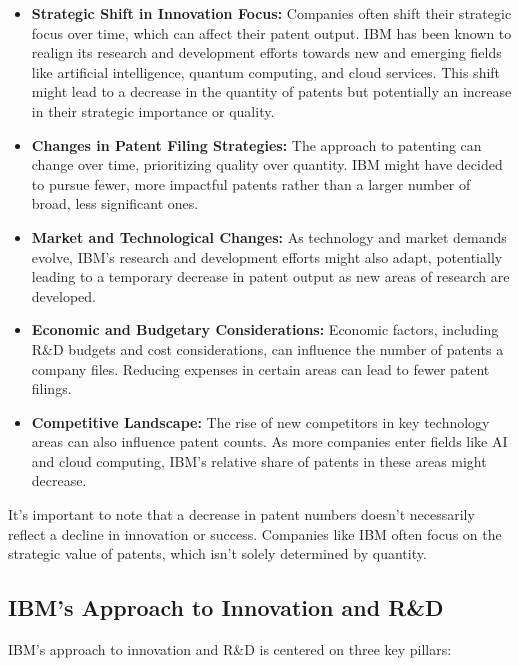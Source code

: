 \begin{itemize}
  \item \textbf{Strategic Shift in Innovation Focus:} Companies often shift their strategic focus over time, which can affect their patent output. IBM has been known to realign its research and development efforts towards new and emerging fields like artificial intelligence, quantum computing, and cloud services. This shift might lead to a decrease in the quantity of patents but potentially an increase in their strategic importance or quality.

  \item \textbf{Changes in Patent Filing Strategies:} The approach to patenting can change over time, prioritizing quality over quantity. IBM might have decided to pursue fewer, more impactful patents rather than a larger number of broad, less significant ones.

  \item \textbf{Market and Technological Changes:} As technology and market demands evolve, IBM's research and development efforts might also adapt, potentially leading to a temporary decrease in patent output as new areas of research are developed.

  \item \textbf{Economic and Budgetary Considerations:} Economic factors, including R\&D budgets and cost considerations, can influence the number of patents a company files. Reducing expenses in certain areas can lead to fewer patent filings.

  \item \textbf{Competitive Landscape:} The rise of new competitors in key technology areas can also influence patent counts. As more companies enter fields like AI and cloud computing, IBM's relative share of patents in these areas might decrease.
\end{itemize}

It's important to note that a decrease in patent numbers doesn't necessarily reflect a decline in innovation or success. Companies like IBM often focus on the strategic value of patents, which isn't solely determined by quantity.



\subsection{IBM's Approach to Innovation and R\&D}

IBM's approach to innovation and R\&D is centered on three key pillars:

